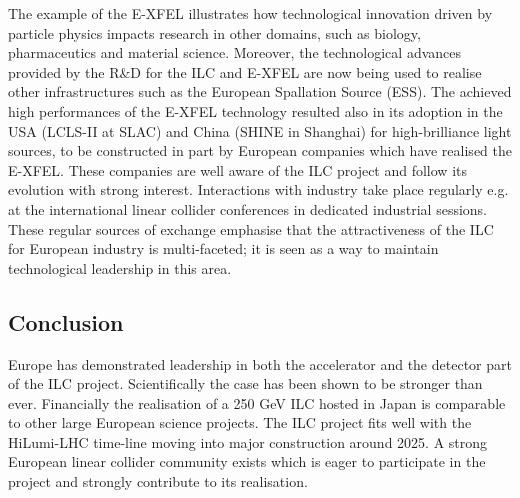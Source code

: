 \documentclass[%
 reprint,
 floatfix,
 amsmath,amssymb,
 aps,
]{revtex4-1}
\begin{document}
The example of the E-XFEL illustrates how technological innovation driven by particle physics impacts research in other domains, such as biology, pharmaceutics and material science. Moreover, the technological advances provided by the R\&D for the ILC and E-XFEL are now being used to realise other infrastructures such as the European Spallation Source (ESS).
The achieved high performances of the E-XFEL technology resulted also in its adoption in the USA (LCLS-II at SLAC) and China (SHINE in Shanghai) for high-brilliance light sources, to be constructed in part by European companies which have realised the E-XFEL. These companies are well aware of the ILC project and follow its evolution with strong interest. Interactions with industry take place regularly e.g. at the international linear collider conferences in dedicated industrial sessions. These regular sources of exchange emphasise that the attractiveness of the ILC for European industry is multi-faceted; 
it is seen as a way to maintain technological leadership in this area. 

\subsection{Conclusion}
Europe has demonstrated leadership in both the accelerator and the detector part of the ILC project. 
Scientifically the case has been shown to be stronger than ever. Financially the realisation of a 250 GeV ILC hosted in Japan is comparable to other large European science projects. The ILC project fits well with the HiLumi-LHC time-line moving into major construction around 2025. A strong European linear collider community exists which is eager to participate in the project and strongly contribute to its realisation. 







\onecolumngrid
\newpage

\appendix
\end{document}
